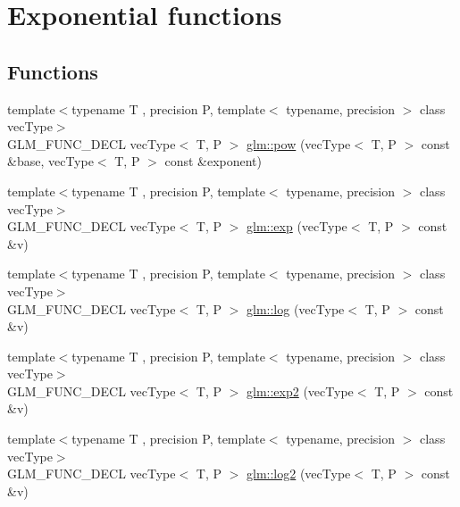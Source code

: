 \hypertarget{group__core__func__exponential}{\section{Exponential functions}
\label{group__core__func__exponential}
}
\subsection*{Functions}
\begin{DoxyCompactItemize}
\item 
{\footnotesize template$<$typename T , precision P, template$<$ typename, precision $>$ class vec\-Type$>$ }\\G\-L\-M\-\_\-\-F\-U\-N\-C\-\_\-\-D\-E\-C\-L vec\-Type$<$ T, P $>$ \hyperlink{group__core__func__exponential_ga082b332a4b7c6ad1d43e09ff19e214dd}{glm\-::pow} (vec\-Type$<$ T, P $>$ const \&base, vec\-Type$<$ T, P $>$ const \&exponent)
\item 
{\footnotesize template$<$typename T , precision P, template$<$ typename, precision $>$ class vec\-Type$>$ }\\G\-L\-M\-\_\-\-F\-U\-N\-C\-\_\-\-D\-E\-C\-L vec\-Type$<$ T, P $>$ \hyperlink{group__core__func__exponential_ga25e54a7f44fc49ec6ac6ffc7675cf04a}{glm\-::exp} (vec\-Type$<$ T, P $>$ const \&v)
\item 
{\footnotesize template$<$typename T , precision P, template$<$ typename, precision $>$ class vec\-Type$>$ }\\G\-L\-M\-\_\-\-F\-U\-N\-C\-\_\-\-D\-E\-C\-L vec\-Type$<$ T, P $>$ \hyperlink{group__core__func__exponential_ga21efca311e62d233de0ae96bab126b83}{glm\-::log} (vec\-Type$<$ T, P $>$ const \&v)
\item 
{\footnotesize template$<$typename T , precision P, template$<$ typename, precision $>$ class vec\-Type$>$ }\\G\-L\-M\-\_\-\-F\-U\-N\-C\-\_\-\-D\-E\-C\-L vec\-Type$<$ T, P $>$ \hyperlink{group__core__func__exponential_ga42ca440d9062f1f456f5a9e896378f9c}{glm\-::exp2} (vec\-Type$<$ T, P $>$ const \&v)
\item 
{\footnotesize template$<$typename T , precision P, template$<$ typename, precision $>$ class vec\-Type$>$ }\\G\-L\-M\-\_\-\-F\-U\-N\-C\-\_\-\-D\-E\-C\-L vec\-Type$<$ T, P $>$ \hyperlink{group__core__func__exponential_gabae30945338a555a03733f00dad95d0d}{glm\-::log2} (vec\-Type$<$ T, P $>$ const \&v)
\item 

\end{DoxyCompactItemize}
